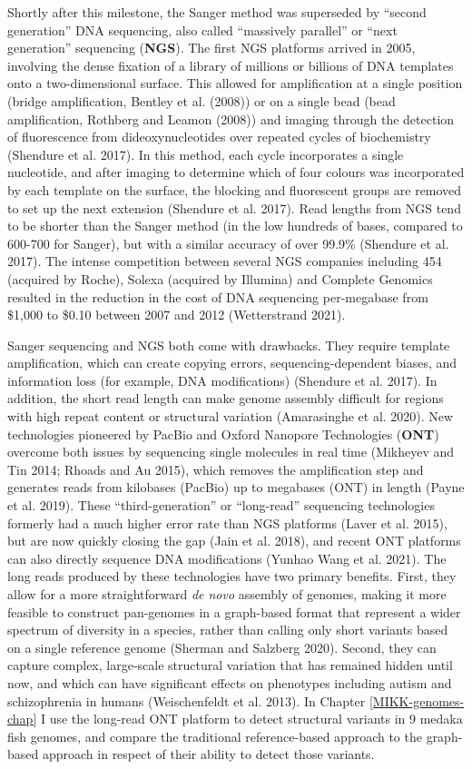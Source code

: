 \documentclass[
]{book}
\begin{document}
Shortly after this milestone, the Sanger method was superseded by ``second generation'' DNA sequencing, also called ``massively parallel'' or ``next generation'' sequencing (\textbf{NGS}). The first NGS platforms arrived in 2005, involving the dense fixation of a library of millions or billions of DNA templates onto a two-dimensional surface. This allowed for amplification at a single position (bridge amplification, Bentley et al. (2008)) or on a single bead (bead amplification, Rothberg and Leamon (2008)) and imaging through the detection of fluorescence from dideoxynucleotides over repeated cycles of biochemistry (Shendure et al. 2017). In this method, each cycle incorporates a single nucleotide, and after imaging to determine which of four colours was incorporated by each template on the surface, the blocking and fluorescent groups are removed to set up the next extension (Shendure et al. 2017). Read lengths from NGS tend to be shorter than the Sanger method (in the low hundreds of bases, compared to 600-700 for Sanger), but with a similar accuracy of over 99.9\% (Shendure et al. 2017). The intense competition between several NGS companies including 454 (acquired by Roche), Solexa (acquired by Illumina) and Complete Genomics resulted in the reduction in the cost of DNA sequencing per-megabase from \$1,000 to \$0.10 between 2007 and 2012 (Wetterstrand 2021).

Sanger sequencing and NGS both come with drawbacks. They require template amplification, which can create copying errors, sequencing-dependent biases, and information loss (for example, DNA modifications) (Shendure et al. 2017). In addition, the short read length can make genome assembly difficult for regions with high repeat content or structural variation (Amarasinghe et al. 2020). New technologies pioneered by PacBio and Oxford Nanopore Technologies (\textbf{ONT}) overcome both issues by sequencing single molecules in real time (Mikheyev and Tin 2014; Rhoads and Au 2015), which removes the amplification step and generates reads from kilobases (PacBio) up to megabases (ONT) in length (Payne et al. 2019). These ``third-generation'' or ``long-read'' sequencing technologies formerly had a much higher error rate than NGS platforms (Laver et al. 2015), but are now quickly closing the gap (Jain et al. 2018), and recent ONT platforms can also directly sequence DNA modifications (Yunhao Wang et al. 2021). The long reads produced by these technologies have two primary benefits. First, they allow for a more straightforward \emph{de novo} assembly of genomes, making it more feasible to construct pan-genomes in a graph-based format that represent a wider spectrum of diversity in a species, rather than calling only short variants based on a single reference genome (Sherman and Salzberg 2020). Second, they can capture complex, large-scale structural variation that has remained hidden until now, and which can have significant effects on phenotypes including autism and schizophrenia in humans (Weischenfeldt et al. 2013). In Chapter \ref{MIKK-genomes-chap} I use the long-read ONT platform to detect structural variants in 9 medaka fish genomes, and compare the traditional reference-based approach to the graph-based approach in respect of their ability to detect those variants.
\end{document}
